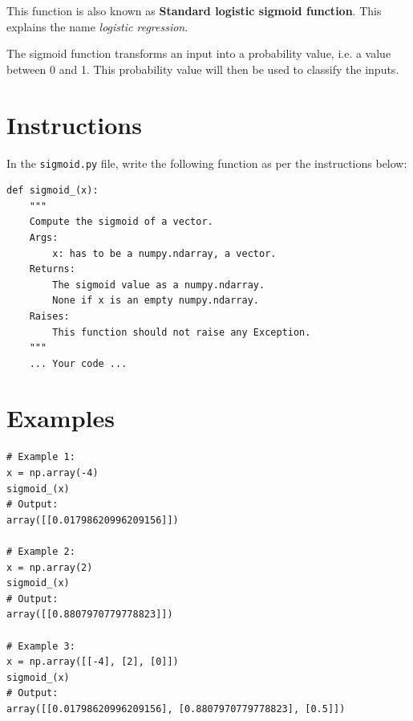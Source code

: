 \documentclass{42-en}
\begin{document}
This function is also known as \textbf{Standard logistic sigmoid function}.
This explains the name \textit{logistic regression}.

The sigmoid function transforms an input into a probability value, i.e. a value between 0 and 1.  
This probability value will then be used to classify the inputs.

\section*{Instructions}
In the \texttt{sigmoid.py} file, write the following function as per the instructions below:

\par

\begin{verbatim}
def sigmoid_(x):
    """
    Compute the sigmoid of a vector.
    Args:
        x: has to be a numpy.ndarray, a vector.
    Returns: 
        The sigmoid value as a numpy.ndarray.
        None if x is an empty numpy.ndarray.
    Raises:
        This function should not raise any Exception.
    """
    ... Your code ...
\end{verbatim}

\section*{Examples}

\begin{verbatim}
# Example 1:
x = np.array(-4)
sigmoid_(x)
# Output:
array([[0.01798620996209156]])

# Example 2:
x = np.array(2)
sigmoid_(x)
# Output:
array([[0.8807970779778823]])

# Example 3:
x = np.array([[-4], [2], [0]])
sigmoid_(x)
# Output:
array([[0.01798620996209156], [0.8807970779778823], [0.5]])
\end{verbatim}



\end{document}
